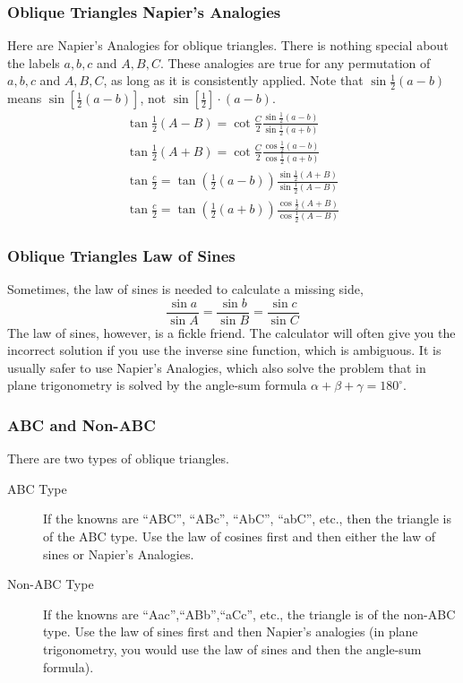 \documentclass[xcolor=dvipsnames]{beamer}
\begin{document}
\begin{frame}
  \frametitle{Oblique Triangles Napier's Analogies}
Here are Napier's Analogies for oblique triangles. There is nothing
special about the labels $a,b,c$ and $A,B,C$. These analogies are true
for any permutation of $a,b,c$ and $A,B,C$, as long as it is
consistently applied. Note that $\sin\frac{1}{2}(a-b)$ means
$\sin[\frac{1}{2}(a-b)]$, not $\sin[\frac{1}{2}]\cdot{}(a-b)$.
\begin{equation}
  \label{eq:uteseivu}
  \begin{array}{l}
    \tan\frac{1}{2}(A-B)=\cot\frac{C}{2}\frac{\sin\frac{1}{2}(a-b)}{\sin\frac{1}{2}(a+b)} \\
    \tan\frac{1}{2}(A+B)=\cot\frac{C}{2}\frac{\cos\frac{1}{2}(a-b)}{\cos\frac{1}{2}(a+b)} \\
    \tan\frac{c}{2}=\tan\left(\frac{1}{2}(a-b)\right)\frac{\sin\frac{1}{2}(A+B)}{\sin\frac{1}{2}(A-B)} \\
    \tan\frac{c}{2}=\tan\left(\frac{1}{2}(a+b)\right)\frac{\cos\frac{1}{2}(A+B)}{\cos\frac{1}{2}(A-B)}
  \end{array}
\end{equation}
\end{frame}

\begin{frame}
  \frametitle{Oblique Triangles Law of Sines}
Sometimes, the law of sines is needed to calculate a missing side,
\begin{equation}
  \label{eq:aebaeyun}
  \frac{\sin{}a}{\sin{}A}=\frac{\sin{}b}{\sin{}B}=\frac{\sin{}c}{\sin{}C}
\end{equation}
The law of sines, however, is a fickle friend. The calculator will
often give you the incorrect solution if you use the inverse sine
function, which is ambiguous. It is usually safer to use Napier's
Analogies, which also solve the problem that in plane trigonometry is
solved by the angle-sum formula $\alpha+\beta+\gamma=180^{\circ}$.
\end{frame}

\begin{frame}
  \frametitle{ABC and Non-ABC}
  There are two types of oblique triangles.
  \begin{description}
  \item[ABC Type] If the knowns are ``ABC'', ``ABc'', ``AbC'', ``abC'', etc.,
    then the triangle is of the ABC type. Use the law of cosines first
    and then either the law of sines or Napier's Analogies.
  \item[Non-ABC Type] If the knowns are ``Aac'',``ABb'',``aCc'', etc., the
    triangle is of the non-ABC type. Use the law of sines first and
    then Napier's analogies (in plane trigonometry, you would use the
    law of sines and then the angle-sum formula).
  \end{description}
\end{frame}
\end{document}
